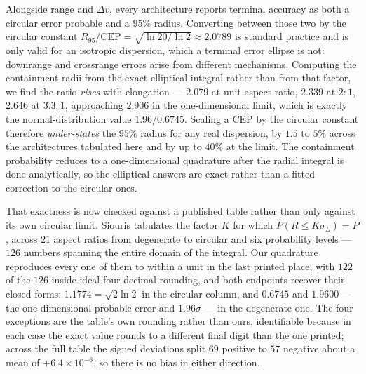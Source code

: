 \documentclass[11pt,a4paper]{article}
\theoremstyle{definition}
\numberwithin{equation}{section}
\begin{document}
Alongside range and $\Delta v$, every architecture reports terminal accuracy as both a circular error probable and a $95\%$ radius. Converting between those two by the circular constant $R_{95}/\mathrm{CEP} = \sqrt{\ln 20 / \ln 2} \approx 2.0789$ is standard practice and is only valid for an isotropic dispersion, which a terminal error ellipse is not: downrange and crossrange errors arise from different mechanisms. Computing the containment radii from the exact elliptical integral rather than from that factor, we find the ratio \emph{rises} with elongation --- $2.079$ at unit aspect ratio, $2.339$ at $2\!:\!1$, $2.646$ at $3.3\!:\!1$, approaching $2.906$ in the one-dimensional limit, which is exactly the normal-distribution value $1.96/0.6745$. Scaling a CEP by the circular constant therefore \emph{under-states} the $95\%$ radius for any real dispersion, by $1.5$ to $5\%$ across the architectures tabulated here and by up to $40\%$ at the limit. The containment probability reduces to a one-dimensional quadrature after the radial integral is done analytically, so the elliptical answers are exact rather than a fitted correction to the circular ones.

That exactness is now checked against a published table rather than only against its own circular limit. Siouris \cite[Table 5.2]{siouris2004} tabulates the factor $K$ for which $P(R \le K\sigma_L) = P$, across $21$ aspect ratios from degenerate to circular and six probability levels --- $126$ numbers spanning the entire domain of the integral. Our quadrature reproduces every one of them to within a unit in the last printed place, with $122$ of the $126$ inside ideal four-decimal rounding, and both endpoints recover their closed forms: $1.1774 = \sqrt{2\ln 2}$ in the circular column, and $0.6745$ and $1.9600$ --- the one-dimensional probable error and $1.96\sigma$ --- in the degenerate one. The four exceptions are the table's own rounding rather than ours, identifiable because in each case the exact value rounds to a different final digit than the one printed; across the full table the signed deviations split $69$ positive to $57$ negative about a mean of $+6.4\times10^{-6}$, so there is no bias in either direction.
\end{document}
